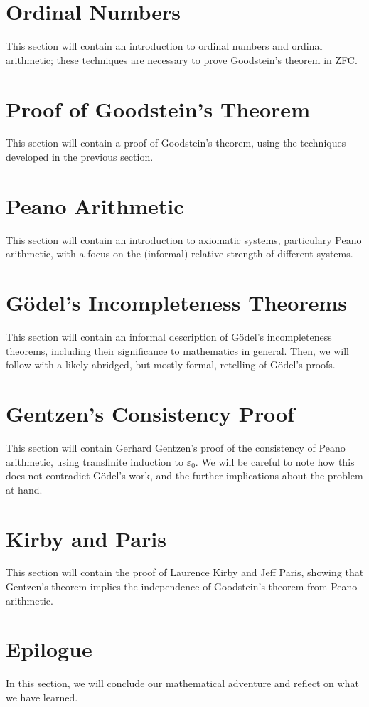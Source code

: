 \documentclass[10pt]{article}
\newcommand{\epz}{\varepsilon_0}
\begin{document}
\section{Ordinal Numbers}
This section will contain an introduction to ordinal numbers and ordinal arithmetic; these techniques are necessary to prove Goodstein's theorem in ZFC.

\section{Proof of Goodstein's Theorem}
This section will contain a proof of Goodstein's theorem, using the techniques developed in the previous section.

\section{Peano Arithmetic}
This section will contain an introduction to axiomatic systems, particulary Peano arithmetic, with a focus on the (informal) relative strength of different systems.

\section{G{\"o}del's Incompleteness Theorems}
This section will contain an informal description of G{\"o}del's incompleteness theorems, including their significance to mathematics in general.
Then, we will follow with a likely-abridged, but mostly formal, retelling of G{\"o}del's proofs.

\section{Gentzen's Consistency Proof}
This section will contain Gerhard Gentzen's proof of the consistency of Peano arithmetic, using transfinite induction to $\epz$.
We will be careful to note how this does not contradict G{\"o}del's work, and the further implications about the problem at hand.

\section{Kirby and Paris}
This section will contain the proof of Laurence Kirby and Jeff Paris, showing that Gentzen's theorem implies the independence of Goodstein's theorem from Peano arithmetic.

\section{Epilogue}
In this section, we will conclude our mathematical adventure and reflect on what we have learned.
\end{document}
